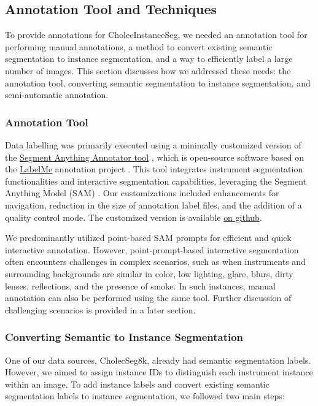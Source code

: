 \subsection*{Annotation Tool and Techniques} \label{sec:annotation_methods}
To provide annotations for CholecInstanceSeg, we needed an annotation tool for performing manual annotations, a method to convert existing semantic segmentation to instance segmentation, and a way to efficiently label a large number of images. This section discusses how we addressed these needs: the annotation tool, converting semantic segmentation to instance segmentation, and semi-automatic annotation.

\subsubsection*{Annotation Tool}\label{sec:annotation_tool}
Data labelling was primarily executed using a minimally customized version of the \href{https://github.com/haochenheheda/segment-anything-annotator}{Segment Anything Annotator tool} \cite{wangsupplementary}, which is open-source software based on the \href{https://github.com/labelmeai/labelme}{LabelMe} annotation project \cite{wada2016labelme}. This tool integrates instrument segmentation functionalities and interactive segmentation capabilities, leveraging the Segment Anything Model (SAM) \cite{kirillov2023segment}. Our customizations included enhancements for navigation, reduction in the size of annotation label files, and the addition of a quality control mode. The customized version is available \href{https://github.com/labdeeman7/my_samannotator}{on github}.

We predominantly utilized point-based SAM prompts for efficient and quick interactive annotation. However, point-prompt-based interactive segmentation often encounters challenges in complex scenarios, such as when instruments and surrounding backgrounds are similar in color, low lighting, glare, blurs, dirty lenses, reflections, and the presence of smoke. In such instances, manual annotation can also be performed using the same tool. Further discussion of challenging scenarios is provided in a later section.

\subsubsection*{Converting Semantic to Instance Segmentation} \label{sec:semantic_to_instance}
One of our data sources, CholecSeg8k, already had semantic segmentation labels. However, we aimed to assign instance IDs to distinguish each instrument instance within an image. To add instance labels and convert existing semantic segmentation labels to instance segmentation, we followed two main steps:

